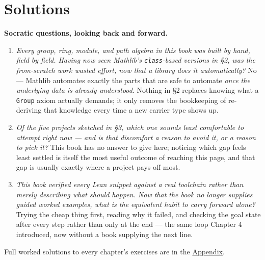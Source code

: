 \section{Solutions}\label{sec:13-next-steps:04-solutions:1}

\textbf{Socratic questions, looking back and forward.}

\begin{enumerate}
\def\labelenumi{\arabic{enumi}.}
\tightlist
\item
  \emph{Every group, ring, module, and path algebra in this book was built by hand, field by field. Having now seen Mathlib's \texttt{class}-based versions in §2, was the from-scratch work wasted effort, now that a library does it automatically?} No --- Mathlib automates exactly the parts that are safe to automate \emph{once the underlying data is already understood}. Nothing in §2 replaces knowing what a \texttt{Group} axiom actually demands; it only removes the bookkeeping of re-deriving that knowledge every time a new carrier type shows up.
\item
  \emph{Of the five projects sketched in §3, which one sounds least comfortable to attempt right now --- and is that discomfort a reason to avoid it, or a reason to pick it?} This book has no answer to give here; noticing which gap feels least settled is itself the most useful outcome of reaching this page, and that gap is usually exactly where a project pays off most.
\item
  \emph{This book verified every Lean snippet against a real toolchain rather than merely describing what should happen. Now that the book no longer supplies guided worked examples, what is the equivalent habit to carry forward alone?} Trying the cheap thing first, reading why it failed, and checking the goal state after every step rather than only at the end --- the same loop Chapter 4 introduced, now without a book supplying the next line.
\end{enumerate}

Full worked solutions to every chapter's exercises are in the \hyperref[sec:14-appendix-solutions:00-index:1]{Appendix}.
